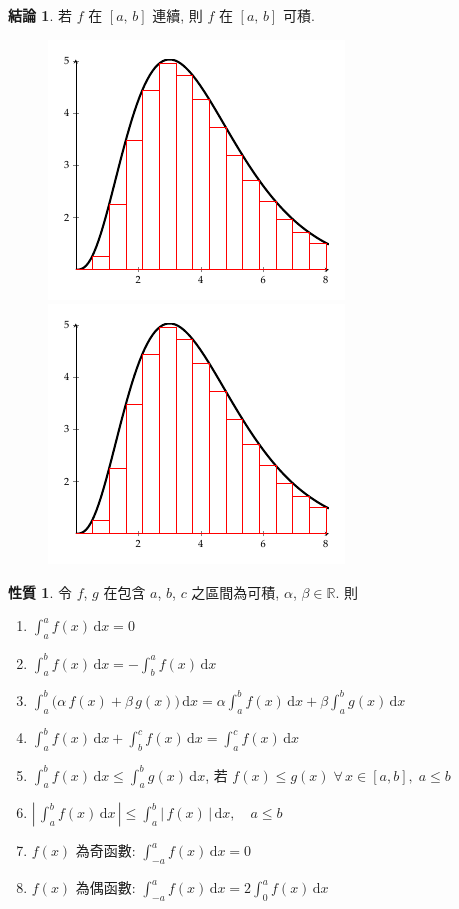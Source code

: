 \documentclass[12pt]{extarticle}
\newcommand{\ds}{\displaystyle}
\theoremstyle{definition}
\newtheorem*{prp}{性質}
\newtheorem*{fact}{結論}
\begin{document}
\begin{fact}
  若 $f$ 在 $[a,\,b]$ 連續, 則 $f$ 在 $[a,\,b]$ 可積. 
\end{fact}

\begin{figure}[!htbp]
  \centering
  \includegraphics[scale=1,page=1]{lu}
  \hspace{2cm}
  \includegraphics[scale=1,page=2]{lu}
\end{figure}

\begin{prp}%
  令 $f$, $g$ 在包含 $a$, $b$, $c$ 之區間為可積, $\alpha$, $\beta\in\mathbb{R}$. 則
  \begin{enumerate}\setlength{\itemsep}{0pt}
    \item $\ds\int_a^a f(x)\,\text{d}x = 0$
    \item $\ds\int_a^b f(x)\,\text{d}x = -\int_b^a f(x)\,\text{d}x$
    \item $\ds\int_a^b \big(\alpha\,f(x) + \beta\,g(x)\big)\,\text{d}x = \alpha\int_a^b f(x)\,\text{d}x + \beta\int_a^b g(x)\,\text{d}x$
    \item $\ds\int_a^b f(x)\,\text{d}x + \int_b^c f(x)\,\text{d}x = \int_a^c f(x)\,\text{d}x$
    \item $\ds\int_a^b f(x)\,\text{d}x\leqslant\int_a^b g(x)\,\text{d}x$, 若 $f(x)\leqslant g(x)\;\forall\,x\in[a, b],\;a\leqslant b$
    \item $\ds\left|\,\int_a^b f(x)\,\text{d}x\,\right|\leqslant \int_a^b \left|\,f(x)\,\right|\,\text{d}x, \quad a\leqslant b$ 
    \item $f(x)$ 為奇函數: $\ds\int_{-a}^a f(x)\,\text{d}x = 0$
    \item $f(x)$ 為偶函數: $\ds\int_{-a}^a f(x)\,\text{d}x = 2\int_0^a f(x)\,\text{d}x$
  \end{enumerate}
\end{prp}
\end{document}
